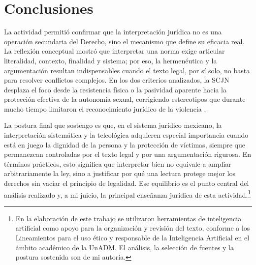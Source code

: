 \documentclass[
	spanish,
	letterpaper, oneside
]{article}
\begin{document}
\section{Conclusiones}

La actividad permitió confirmar que la interpretación jurídica no es una operación secundaria del Derecho, sino el mecanismo que define su eficacia real. La reflexión conceptual mostró que interpretar una norma exige articular literalidad, contexto, finalidad y sistema; por eso, la hermenéutica y la argumentación resultan indispensables cuando el texto legal, por sí solo, no basta para resolver conflictos complejos. En los dos criterios analizados, la SCJN desplaza el foco desde la resistencia física o la pasividad aparente hacia la protección efectiva de la autonomía sexual, corrigiendo estereotipos que durante mucho tiempo limitaron el reconocimiento jurídico de la violencia \citep{scjnViolenciaFisica2022,scjnIncapacidadResistencia2019}.

La postura final que sostengo es que, en el sistema jurídico mexicano, la interpretación sistemática y la teleológica adquieren especial importancia cuando está en juego la dignidad de la persona y la protección de víctimas, siempre que permanezcan controladas por el texto legal y por una argumentación rigurosa. En términos prácticos, esto significa que interpretar bien no equivale a ampliar arbitrariamente la ley, sino a justificar por qué una lectura protege mejor los derechos sin vaciar el principio de legalidad. Ese equilibrio es el punto central del análisis realizado y, a mi juicio, la principal enseñanza jurídica de esta actividad.\footnote{En la elaboración de este trabajo se utilizaron herramientas de inteligencia artificial como apoyo para la organización y revisión del texto, conforme a los Lineamientos para el uso ético y responsable de la Inteligencia Artificial en el ámbito académico de la UnADM. El análisis, la selección de fuentes y la postura sostenida son de mi autoría.}




\end{document}
